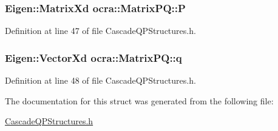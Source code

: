 \subsubsection[{\texorpdfstring{P}{P}}]{\setlength{\rightskip}{0pt plus 5cm}Eigen\+::\+Matrix\+Xd ocra\+::\+Matrix\+P\+Q\+::P}\hypertarget{structocra_1_1MatrixPQ_ae37e780774f14b1097de106d1480cee4}{}\label{structocra_1_1MatrixPQ_ae37e780774f14b1097de106d1480cee4}


Definition at line 47 of file Cascade\+Q\+P\+Structures.\+h.

\subsubsection[{\texorpdfstring{q}{q}}]{\setlength{\rightskip}{0pt plus 5cm}Eigen\+::\+Vector\+Xd ocra\+::\+Matrix\+P\+Q\+::q}\hypertarget{structocra_1_1MatrixPQ_a5b735797657100582565c6337fb090e1}{}\label{structocra_1_1MatrixPQ_a5b735797657100582565c6337fb090e1}


Definition at line 48 of file Cascade\+Q\+P\+Structures.\+h.



The documentation for this struct was generated from the following file\+:\begin{DoxyCompactItemize}
\item 
\hyperlink{CascadeQPStructures_8h}{Cascade\+Q\+P\+Structures.\+h}\end{DoxyCompactItemize}
